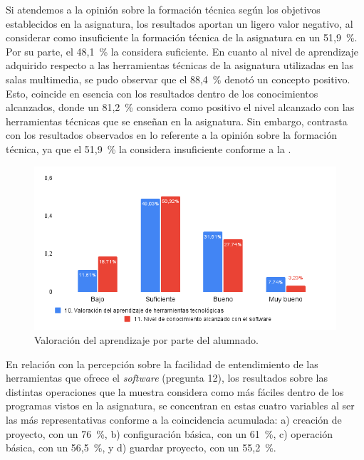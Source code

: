 \documentclass[spanish]{textolivre}
\begin{document}
Si atendemos a la opinión sobre la formación técnica según los objetivos establecidos en la asignatura, los resultados aportan un ligero valor negativo, al considerar como insuficiente la formación técnica de la asignatura en un 51,9~\%. Por su parte, el 48,1~\% la considera suficiente. En cuanto al nivel de aprendizaje adquirido respecto a las herramientas técnicas de la asignatura utilizadas en las salas multimedia, se pudo observar que el 88,4~\% denotó un concepto positivo. Esto, coincide en esencia con los resultados dentro de los conocimientos alcanzados, donde un 81,2~\% considera como positivo el nivel alcanzado con las herramientas técnicas que se enseñan en la asignatura. Sin embargo, contrasta con los resultados observados en lo referente a la opinión sobre la formación técnica, ya que el 51,9~\% la considera insuficiente conforme a la .

\begin{figure}[h!]
\centering
\begin{minipage}{.8\textwidth}
\includegraphics[width=\linewidth]{Fig1.png}
\caption{Valoración del aprendizaje por parte del alumnado.}
\label{fig1}
\end{minipage}
\end{figure}

En relación con la percepción sobre la facilidad de entendimiento de las herramientas que ofrece el \textit{software} (pregunta 12), los resultados sobre las distintas operaciones que la muestra considera como más fáciles dentro de los programas vistos en la asignatura, se concentran en estas cuatro variables al ser las más representativas conforme a la coincidencia acumulada: a) creación de proyecto, con un 76~\%, b) configuración básica, con un 61~\%, c) operación básica, con un 56,5~\%, y d) guardar proyecto, con un 55,2~\%.
\end{document}
